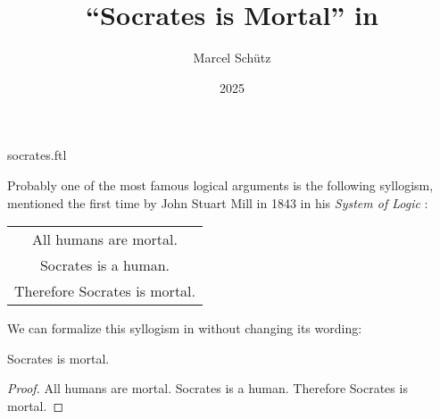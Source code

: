 \documentclass{stex}
\title{``Socrates is Mortal'' in \Naproche}
\author{Marcel Schütz}
\date{2025}
\begin{document}
\begin{smodule}{socrates.ftl}
\maketitle



\noindent Probably one of the most famous logical arguments is the following
syllogism, mentioned the first time by John Stuart Mill in 1843
\cite{Wheeler2023} in his \textit{System of Logic}
\cite[Book II, Chapter 3]{Mill1843}:
\begin{center}
  \begin{tabular}{c}
    All humans are mortal. \\
    Socrates is a human. \\
    \hline
    Therefore Socrates is mortal.
  \end{tabular}
\end{center}
We can formalize this syllogism in \Naproche without changing its wording:

\begin{forthel}
  \begin{theorem}[title=Mill's Syllogism,name=Mill Syllogism]
    Socrates is mortal.
  \end{theorem}
  \begin{proof}
    All humans are mortal.
    Socrates is a human.
    Therefore Socrates is mortal.
  \end{proof}
\end{forthel}

%

\printbibliography
{}

\end{smodule}
\end{document}
